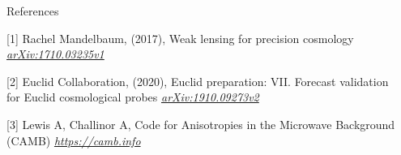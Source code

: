\begin{frame}[t]
\begin{columns}[t]
\begin{column}{.465\textwidth}
\begin{block}{References}

\footnotesize{
\begin{thebibliography}{99}
             [1] Rachel Mandelbaum, (2017),
            \newblock Weak lensing for precision cosmology
            \newblock \emph{\url{arXiv:1710.03235v1}}
            
             [2] Euclid Collaboration, (2020),
            \newblock Euclid preparation: VII. Forecast validation for Euclid cosmological probes
            \newblock \emph{\url{arXiv:1910.09273v2}}

             [3] Lewis A, Challinor A,
            \newblock Code for Anisotropies in the Microwave Background (CAMB)
	    \newblock \emph{\url{https://camb.info}}
        \end{thebibliography}
    }

\end{block}


\end{column} %

\begin{column}{.015\textwidth}\end{column} %

\end{columns} %

\end{frame}

